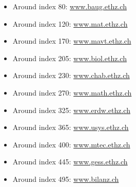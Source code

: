 \documentclass[unicode,11pt,a4paper,oneside,numbers=endperiod,openany]{scrartcl}
\begin{document}
\begin{itemize}
    \item  Around index 80: \href{http://www.baug.ethz.ch}{ www.baug.ethz.ch}
    \item  Around index 120: \href{http://www.mat.ethz.ch}{www.mat.ethz.ch}
    \item  Around index 170: \href{http://www.mavt.ethz.ch}{www.mavt.ethz.ch}
    \item  Around index 205: \href{http://www.biol.ethz.ch}{www.biol.ethz.ch}
    \item  Around index 230: \href{http://www.chab.ethz.ch}{www.chab.ethz.ch}
    \item  Around index 270: \href{http://www.math.ethz.ch}{www.math.ethz.ch}
    \item  Around index 325: \href{http://www.erdw.ethz.ch}{www.erdw.ethz.ch}
    \item  Around index 365: \href{http://www.usys.ethz.ch}{www.usys.ethz.ch}
    \item  Around index 400: \href{http://www.mtec.ethz.ch}{www.mtec.ethz.ch}
    \item  Around index 445: \href{http://www.gess.ethz.ch}{www.gess.ethz.ch}
    \item  Around index 495: \href{http://www.bilanz.ch}{www.bilanz.ch}
\end{itemize}
\end{document}

